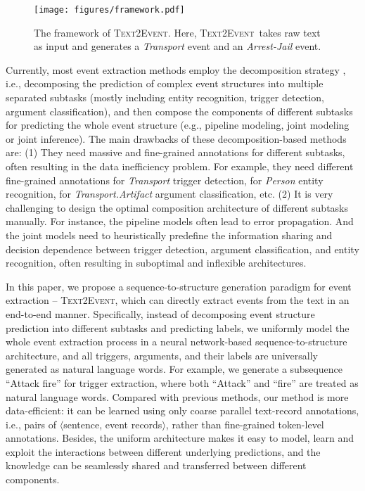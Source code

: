 \documentclass[11pt,a4paper]{article}
\newcommand\modelname{\textsc{Text2Event}}
\newcommand{\eventtpye}[1]{\textit{#1}}
\begin{document}
\begin{figure}[!tpb]
    \centering
    \texttt{[image: figures/framework.pdf]}
    \caption{
        The framework of \modelname.
        Here, \modelname\, takes  raw  text as  input  and  generates a \eventtpye{Transport} event and an \eventtpye{Arrest-Jail} event.
        }
    \label{fig:motivation}
\end{figure}

Currently, most event extraction methods employ the decomposition strategy \citep{chen-etal-2015-event,Nguyen-Nguyen:2019:AAAI2019,wadden-etal-2019-entity,Zhang:2019:GAIL,du-cardie-2020-event,li-etal-2020-event,paolini2021structured}, i.e., decomposing the prediction of complex event structures into multiple separated subtasks (mostly including entity recognition, trigger detection, argument classification), and then compose the components of different subtasks for predicting the whole event structure (e.g., pipeline modeling, joint modeling or joint inference).
The main drawbacks of these decomposition-based methods are:
(1) They need massive and fine-grained annotations for different subtasks, often resulting in the data inefficiency problem.
For example, they need different fine-grained annotations for \eventtpye{Transport} trigger detection, for \eventtpye{Person} entity recognition, for \eventtpye{Transport.Artifact} argument classification, etc.
(2) It is very challenging to design the optimal composition architecture of different subtasks manually.
For instance, the pipeline models often lead to error propagation.
And the joint models need to heuristically predefine the information sharing and decision dependence between trigger detection, argument classification, and entity recognition, often resulting in suboptimal and inflexible architectures.

In this paper, we propose a sequence-to-structure generation paradigm for event extraction -- \modelname, which can directly extract events from the text in an end-to-end manner.
Specifically, instead of decomposing event structure prediction into different subtasks and predicting labels, we uniformly model the whole event extraction process in a neural network-based sequence-to-structure architecture, and all triggers, arguments, and their labels are universally generated as natural language words.
For example, we generate a subsequence ``Attack fire'' for trigger extraction, where both ``Attack'' and ``fire'' are treated as natural language words.
Compared with previous methods, our method is more data-efficient: it can be learned using only coarse parallel text-record annotations, i.e., pairs of $\langle$sentence, event records$\rangle$, rather than fine-grained token-level annotations.
Besides, the uniform architecture makes it easy to model, learn and exploit the interactions between different underlying predictions, and the knowledge can be seamlessly shared and transferred between different components.
\end{document}
